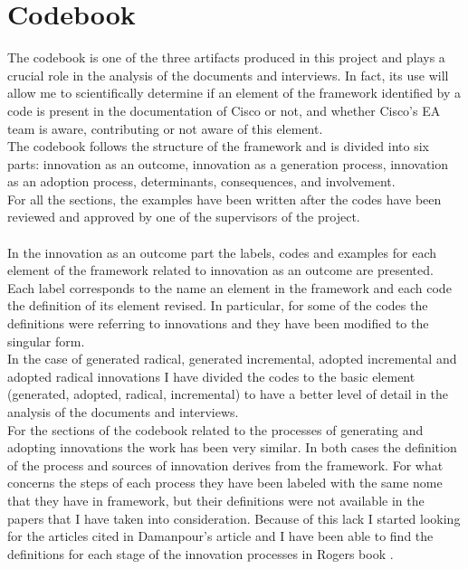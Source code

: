 \section{Codebook}
The codebook is one of the three artifacts produced in this project and plays a crucial role in the analysis of the documents and interviews.
In fact, its use will allow me to scientifically determine if an element of the framework identified by a code is present in the documentation of Cisco or not, and whether Cisco's EA team is aware, contributing or not aware of this element. \\
The codebook follows the structure of the framework and is divided into six parts: innovation as an outcome, innovation as a generation process, innovation as an adoption process, determinants, consequences, and involvement. \\
For all the sections, the examples have been written after the codes have been reviewed and approved by one of the supervisors of the project.
\\ \\ %
In the innovation as an outcome part the labels, codes and examples for each element of the framework related to innovation as an outcome are presented. Each label corresponds to the name an element in the framework and each code the definition of its element revised. In particular, for some of the codes the definitions were referring to innovations and they have been modified to the singular form. \\
In the case of generated radical, generated incremental, adopted incremental and adopted radical innovations I have divided the codes to the basic element (generated, adopted, radical, incremental) to have a better level of detail in the analysis of the documents and interviews.
\\ %
For the sections of the codebook related to the processes of generating and adopting innovations the work has been very similar. In both cases the definition of the process and sources of innovation derives from the framework.
For what concerns the steps of each process they have been labeled with the same nome that they have in framework, but their definitions were not available in the papers that I have taken into consideration. Because of this lack I started looking for the articles cited in Damanpour's article \citep{damanpour2006} and I have been able to find the definitions for each stage of the innovation processes in Rogers book \citep{rogers2003}. \\
